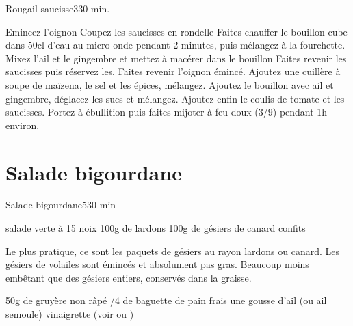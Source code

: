 {\begin{recette}{Rougail saucisse}{3}{30 min.}{}
\begin{preparation}
\etape Emincez l'oignon
\etape Coupez les saucisses en rondelle
\etape Faites chauffer le bouillon cube dans 50cl d'eau au micro onde pendant 2 minutes, puis mélangez à la fourchette. 
\etape Mixez l'ail et le gingembre et mettez à macérer dans le bouillon
\etape Faites revenir les saucisses puis réservez les.
\etape Faites revenir l'oignon émincé. Ajoutez une cuillère à soupe de maïzena, le sel et les épices, mélangez.
\etape Ajoutez le bouillon avec ail et gingembre, déglacez les sucs et mélangez. 
\etape Ajoutez enfin le coulis de tomate et les saucisses.
\etape Portez à ébullition puis faites mijoter à feu doux (3/9) pendant 1h environ. 
\end{preparation}
\end{recette}


\section{Salade bigourdane}
\begin{recette}{Salade bigourdane}{5}{30 min}{}
\begin{ingredients}
\ingredient salade verte
 à 15 noix
\ingredient 100g de lardons
\ingredient 100g de gésiers de canard confits
\begin{remarque}
Le plus pratique, ce sont les paquets de gésiers au rayon lardons ou canard. Les gésiers de volailes sont émincés et absolument 
pas gras. Beaucoup moins embêtant que des gésiers entiers, conservés dans la graisse.
\end{remarque}
\ingredient 50g de gruyère non râpé
/4 de baguette de pain frais
\ingredient une gousse d'ail (ou ail semoule)
\ingredient vinaigrette (voir  ou )

\end{ingredients}


\end{recette}}
